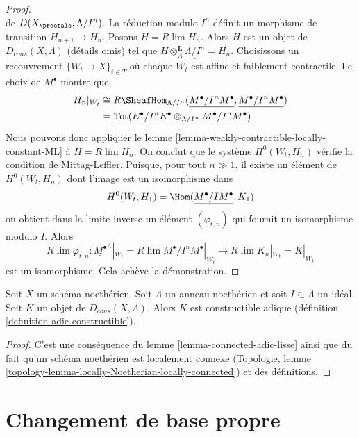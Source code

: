 \begin{proof}
$$$$
de $D(X_\proetale, \Lambda/I^n)$. La réduction modulo $I^n$ définit un
morphisme de transition $H_{n + 1} \to H_n$. Posons $H = R\lim H_n$. Alors $H$ est un
objet de $D_{cons}(X, \Lambda)$ (détails omis) tel que
$H \otimes_\Lambda^\mathbf{L} \underline{\Lambda/I^n} = H_n$.
Choisissons un recouvrement $\{W_t \to X\}_{t \in T}$ où chaque $W_t$
est affine et faiblement contractile. Le choix de $M^\bullet$
montre que
\begin{align*}
H_n|_{W_t} & \cong 
R\SheafHom_{\Lambda/I^n}(\underline{M^\bullet/I^nM^\bullet},
\underline{M^\bullet/I^nM^\bullet}) \\
& =
\underline{
\text{Tot}(E^\bullet/I^nE^\bullet \otimes_{\Lambda/I^n} M^\bullet/I^nM^\bullet)
}
\end{align*}
Nous pouvons donc appliquer le lemme \ref{lemma-weakly-contractible-locally-constant-ML}
à $H = R\lim H_n$. On conclut que le système $H^0(W_t, H_n)$ vérifie la condition de
Mittag-Leffler. Puisque, pour tout $n \gg 1$, il existe un élément de $H^0(W_t, H_n)$
dont l'image est un isomorphisme dans
$$
H^0(W_t, H_1) = \Hom(\underline{M^\bullet/IM^\bullet}, K_1)
$$
on obtient dans la limite inverse un élément $(\varphi_{t, n})$
qui fournit un isomorphisme modulo $I$. Alors
$$
R\lim \varphi_{t, n} :
\underline{M^\bullet}^\wedge|_{W_t} =
R\lim \underline{M^\bullet/I^nM^\bullet}|_{W_t}
\longrightarrow
R\lim K_n|_{W_t} = K|_{W_t}
$$
est un isomorphisme. Cela achève la démonstration.
\end{proof}

\begin{proposition}
\label{proposition-Noetherian-adic-constructible}
Soit $X$ un schéma noethérien. Soit $\Lambda$ un anneau noethérien et
soit $I \subset \Lambda$ un idéal. Soit $K$ un objet de
$D_{cons}(X, \Lambda)$. Alors $K$ est constructible adique
(définition \ref{definition-adic-constructible}).
\end{proposition}

\begin{proof}
C'est une conséquence du lemme \ref{lemma-connected-adic-lisse}
ainsi que du fait qu'un schéma noethérien est localement connexe
(Topologie, lemme \ref{topology-lemma-locally-Noetherian-locally-connected})
et des définitions.
\end{proof}







\section{Changement de base propre}
\label{section-proper-base-change}

